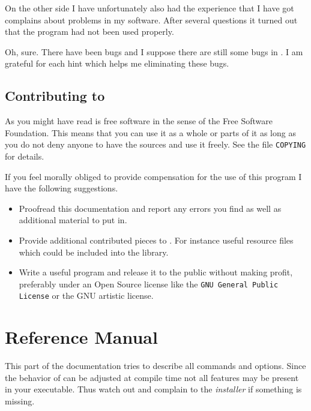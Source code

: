 \documentclass[11pt,a4paper]{scrbook}
\newcommand\LINK[2]{\texttt{#2}}
\begin{document}
On the other side I have unfortunately also had the experience that I have got
complains about problems in my software. After several questions it turned out
that the program had not been used properly.

Oh, sure. There have been bugs and I suppose there are still some bugs in
\BibTool. I am grateful for each hint which helps me eliminating these bugs.



\section{Contributing to \BibTool}

As you might have read \BibTool{} is free software in the sense of the Free
Software Foundation. This means that you can use it as a whole or parts of it
as long as you do not deny anyone to have the sources and use it freely. See
the file \LINK{COPYING}{COPYING} for details.

If you feel morally obliged to provide compensation for the use of this
program I have the following suggestions.

\begin{itemize}
\item Proofread this documentation and report any errors you find as well as
  additional material to put in.
\item Provide additional contributed pieces to \BibTool. For instance useful
  resource files which could be included into the library.
\item Write a useful program and release it to the public without making
  profit, preferably under an Open Source license like the \LINK{GPL.html}{GNU
    General Public License} or the GNU artistic license.
\end{itemize}


\appendix
\chapter{Reference Manual}

This part of the documentation tries to describe all commands and options.
Since the behavior of \BibTool{} can be adjusted at compile time not all
features may be present in your executable. Thus watch out and complain to the
\emph{installer} if something is missing.
\end{document}
